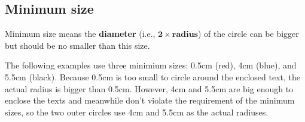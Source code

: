 \documentclass[12pt, letterpaper, oneside]{article}
\begin{document}

\subsection{Minimum size}

Minimum size means the \textbf{diameter} (i.e., $\mathbf{2 \times radius}$) of
the circle can be bigger but should be no smaller than this size.

The following examples use three minimium sizes: 0.5cm (red), 4cm (blue), and
5.5cm (black). Because 0.5cm is too small to circle around the enclosed text,
the actual radius is bigger than 0.5cm. However, 4cm and 5.5cm are big enough
to enclose the texts and meanwhile don't violate the requirement of the minimum
sizes, so the two outer circles use 4cm and 5.5cm as the actual radiuses.

\end{document}
